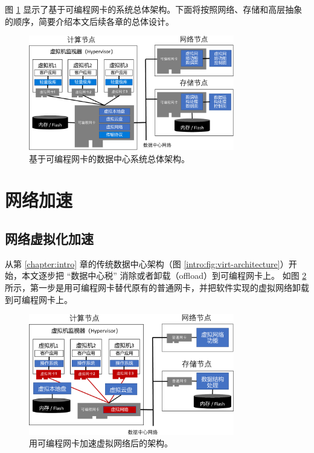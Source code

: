 图 \ref{arch:fig:accel-arch} 显示了基于可编程网卡的系统总体架构。下面将按照网络、存储和高层抽象的顺序，简要介绍本文后续各章的总体设计。


\begin{figure}[htbp]
	\centering
	\includegraphics[width=0.8\textwidth]{figures/accel_arch.pdf}
	\caption{基于可编程网卡的数据中心系统总体架构。}
	\label{arch:fig:accel-arch}
\end{figure}



\section{网络加速}

\subsection{网络虚拟化加速}

从第 \ref{chapter:intro} 章的传统数据中心架构（图 \ref{intro:fig:virt-architecture}）开始，本文逐步把 ``数据中心税'' 消除或者卸载（offload）到可编程网卡上。
如图 \ref{arch:fig:virtual-network} 所示，第一步是用可编程网卡替代原有的普通网卡，并把软件实现的虚拟网络卸载到可编程网卡上。

\begin{figure}[htbp]
	\centering
	\includegraphics[width=0.8\textwidth]{figures/virtual_network.pdf}
	\caption{用可编程网卡加速虚拟网络后的架构。}
	\label{arch:fig:virtual-network}
\end{figure}


